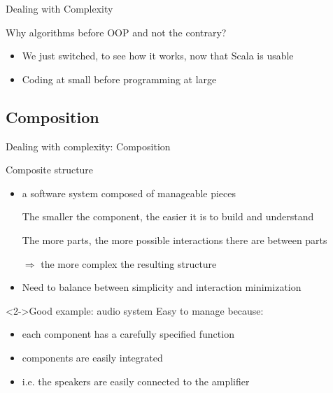 \begin{frame}{Dealing with Complexity}
{    \begin{block}{Why algorithms before OOP and not the contrary?}
      \begin{itemize}\vspace{-.2\baselineskip}
      \item We just switched, to see how it works, now that Scala is usable
      \item Coding at small before programming at large
      \end{itemize}
    \end{block}
  }
\end{frame}

\subsection{Composition}
\begin{frame}{Dealing with complexity: Composition}
  \begin{block}{Composite structure}
    \begin{itemize}
    \item {} a software system composed of
      manageable pieces
    \item[\Smiley] The smaller the component, the easier it is to
      build and understand
    \item[\Frownie] The more parts, the more possible interactions
      there are between parts
    \item[$\Rightarrow$] the more complex the resulting structure
    \item Need to balance between simplicity and interaction minimization
    \end{itemize}
  \end{block}

  \begin{block}<2->{Good example: audio system}\medskip
    Easy to manage because:
    \begin{itemize}
    \item each component has a carefully specified function
    \item components are easily integrated
    \item i.e. the speakers are easily connected to the amplifier
    \end{itemize}
  \end{block}
\end{frame}

